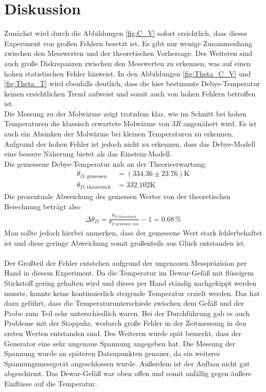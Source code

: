 \section{Diskussion}
\label{sec:Diskussion}
Zunächst wird durch die Abbildungen \ref{fig:C_V} sofort ersichtlich, dass dieses Experiment von großen Fehlern besetzt ist. 
Es gibt nur wenige Zusammenhang zwischen den Messwerten und der theoretischen Vorhersage. Des Weiteren sind 
auch große Diskrepanzen zwischen den Messwerten zu erkennen, was auf einen hohen statistischen Fehler hinweist. In den Abbildungen 
\ref{fig:Theta_C_V} und \ref{fig:Theta_T} wird ebenfalls deutlich, dass die hier bestimmte Debye-Temperatur keinen ersichtlichen Trend aufweist 
und somit auch von hohen Fehlern betroffen ist. \\
Die Messung zu der Molwärme zeigt trotzdem klar, wie im Schnitt bei hohen Temperaturen die klassisch erwartete Molwärme von $3 R$ angenähert wird. 
Es ist auch ein Absinken der Molwärme bei kleinen Temperaturen zu erkennen. Aufgrund der hohen Fehler ist jedoch nicht zu erkennen, dass das Debye-Modell eine bessere Näherung 
bietet als das Einstein-Modell.  \\

Die gemessene Debye-Temperatur nah an der Theorieerwartung:
\begin{align*}
    \theta_{D,\text{gemessen}} &= (334.36 \pm 23.76) \si{\kelvin}\\
    \theta_{D,\text{theoretisch}} &= 332.102 \si{\kelvin}
\end{align*}
Die prozentuale Abweichung des gemessen Wertes von der theoretischen Berechnung beträgt also
\begin{align*}
    \Delta \theta_D =\frac{\theta_{D,\text{theoretisch}}}{\theta_{D,\text{gemessen, min}}} -1 =  0.68 \,\si{\%}
\end{align*}
Man sollte jedoch hierbei anmerken, dass der gemessene Wert stark fehlerbehaftet ist und diese geringe Abweichung somit großenteils aus Glück entstanden ist. \\\\
Der Großteil der Fehler entstehen aufgrund der ungenauen Messpräzision per Hand in diesem Experiment. Da die Temperatur im Dewar-Gefäß mit flüssigem Stickstoff 
gering gehalten wird und dieses per Hand ständig nachgekippt werden musste, konnte keine kontinuierlich steigende Temperatur erzielt werden. 
Das hat dazu geführt, dass die Temperaturunterschiede zwischen dem Gefäß und der Probe zum Teil sehr unterschiedlich waren. 
Bei der Durchführung gab es auch Probleme mit der Stoppuhr, wodurch große Fehler in der Zeitmessung in den ersten Werten entstanden sind. Des Weiteren wurde spät bemerkt, dass der Generator eine sehr ungenaue Spannung angegeben hat. Die Messung der Spannung wurde an späteren Datenpunkten genauer, da ein weiteres Spannungsmessgerät angeschlossen wurde.   
Außerdem ist der Aufbau nicht gut abgeschirmt. Das Dewar-Gefäß war oben offen und somit anfällig gegen äußere Einflüsse auf die Temperatur. 
